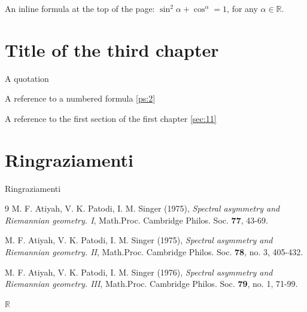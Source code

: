 \documentclass[a4paper,10 pt,titlepage,twoside]{book}
\newcommand{\R}{\mathbb{R}}
\numberwithin{equation}{chapter}
\theoremstyle{plain}
\theoremstyle{definition}
\DeclareMathOperator{\1}{\mathbb{1}}
\begin{document}
\newpage

An inline formula at the top of the page: $\sin^2 \alpha+\cos^\alpha=1$, for any $\alpha\in\R$.
    
    
\chapter{Title of the third chapter}
A quotation \cite{APS1}

A reference to a numbered formula \eqref{ps:2}

A reference to the first section of the first chapter \ref{sec:11}

\chapter*{Ringraziamenti}

Ringraziamenti

\phantom{p. 1}
\clearpage
\thispagestyle{empty}
\phantom{p. 2}
\clearpage
{}

\begin{thebibliography}{9}
M. F. Atiyah, V. K. Patodi, I. M. Singer (1975), \emph{Spectral asymmetry and Riemannian geometry. I}, Math.Proc. Cambridge Philos. Soc. \textbf{77}, 43-69.

M. F. Atiyah, V. K. Patodi, I. M. Singer (1975), \emph{Spectral asymmetry and Riemannian geometry. II}, Math.Proc. Cambridge Philos. Soc. \textbf{78}, no. 3, 405-432.

M. F. Atiyah, V. K. Patodi, I. M. Singer (1976), \emph{Spectral asymmetry and Riemannian geometry. III}, Math.Proc. Cambridge Philos. Soc. \textbf{79}, no. 1, 71-99.

\end{thebibliography}


$\R$
\end{document}
